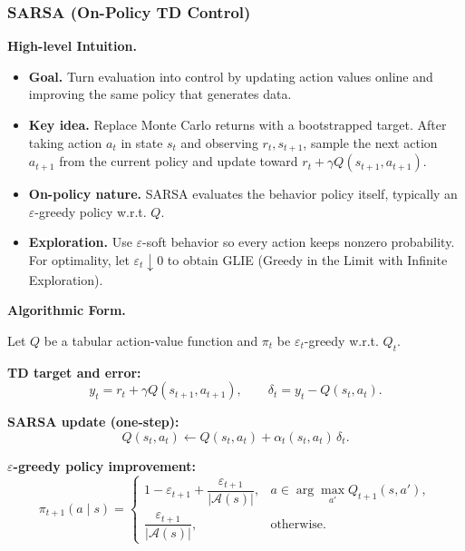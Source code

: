 \documentclass[
]{book}
\providecommand{\tightlist}{%
  \setlength{\itemsep}{0pt}\setlength{\parskip}{0pt}}
\theoremstyle{definition}
\theoremstyle{definition}
\theoremstyle{definition}
\theoremstyle{definition}
\theoremstyle{remark}
\begin{document}
\subsubsection{SARSA (On-Policy TD Control)}\label{sarsa-on-policy-td-control}

\textbf{High-level Intuition.}

\begin{itemize}
\tightlist
\item
  \textbf{Goal.} Turn evaluation into control by updating action values online and improving the same policy that generates data.
\item
  \textbf{Key idea.} Replace Monte Carlo returns with a bootstrapped target. After taking action \(a_t\) in state \(s_t\) and observing \(r_{t}, s_{t+1}\), sample the next action \(a_{t+1}\) from the current policy and update toward \(r_{t} + \gamma Q(s_{t+1}, a_{t+1})\).
\item
  \textbf{On-policy nature.} SARSA evaluates the behavior policy itself, typically an \(\varepsilon\)-greedy policy w.r.t. \(Q\).
\item
  \textbf{Exploration.} Use \(\varepsilon\)-soft behavior so every action keeps nonzero probability. For optimality, let \(\varepsilon_t \downarrow 0\) to obtain GLIE (Greedy in the Limit with Infinite Exploration).
\end{itemize}

\textbf{Algorithmic Form.}

Let \(Q\) be a tabular action-value function and \(\pi_t\) be \(\varepsilon_t\)-greedy w.r.t. \(Q_t\).

\textbf{TD target and error:}
\begin{equation}
y_t = r_{t} + \gamma Q(s_{t+1}, a_{t+1}), \qquad
\delta_t = y_t - Q(s_t, a_t).
\label{eq:SARSA-TDTarget}
\end{equation}

\textbf{SARSA update (one-step):}
\begin{equation}
Q(s_t, a_t) \leftarrow Q(s_t, a_t) + \alpha_t(s_t,a_t)\, \delta_t.
\label{eq:SARSA-QUpdate}
\end{equation}

\textbf{\(\varepsilon\)-greedy policy improvement:}
\begin{equation}
\pi_{t+1}(a\mid s) =
\begin{cases}
1-\varepsilon_{t+1} + \dfrac{\varepsilon_{t+1}}{|\mathcal A(s)|}, & a \in \arg\max_{a'} Q_{t+1}(s,a'),\\
\dfrac{\varepsilon_{t+1}}{|\mathcal A(s)|}, & \text{otherwise.}
\end{cases}
\label{eq:SARSA-PolicyUpdate}
\end{equation}
\end{document}
